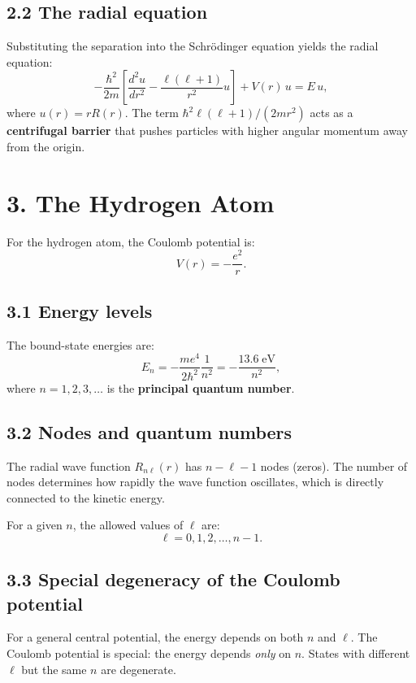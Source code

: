 \documentclass[12pt,a4paper]{article}
\begin{document}
\subsection{2.2 The radial equation}

Substituting the separation into the Schr\"odinger equation yields the radial equation:
\[
    -\frac{\hbar^2}{2m}\left[\frac{d^2 u}{dr^2} - \frac{\ell(\ell+1)}{r^2}u\right] + V(r)\,u = E\,u,
\]
where $u(r) = rR(r)$.  The term $\hbar^2\ell(\ell+1)/(2mr^2)$ acts as a \textbf{centrifugal barrier} that pushes particles with higher angular momentum away from the origin.

\section{3. The Hydrogen Atom}

For the hydrogen atom, the Coulomb potential is:
\[
    V(r) = -\frac{e^2}{r}.
\]

\subsection{3.1 Energy levels}

The bound-state energies are:
\[
    \boxed{E_n = -\frac{me^4}{2\hbar^2}\frac{1}{n^2} = -\frac{13.6\;\text{eV}}{n^2},}
\]
where $n = 1, 2, 3, \ldots$ is the \textbf{principal quantum number}.

\subsection{3.2 Nodes and quantum numbers}

The radial wave function $R_{n\ell}(r)$ has $n - \ell - 1$ nodes (zeros).  The number of nodes determines how rapidly the wave function oscillates, which is directly connected to the kinetic energy.

For a given $n$, the allowed values of $\ell$ are:
\[
    \ell = 0, 1, 2, \ldots, n-1.
\]

\subsection{3.3 Special degeneracy of the Coulomb potential}

For a general central potential, the energy depends on both $n$ and $\ell$.  The Coulomb potential is special: the energy depends \emph{only} on $n$.  States with different $\ell$ but the same $n$ are degenerate.
\end{document}
